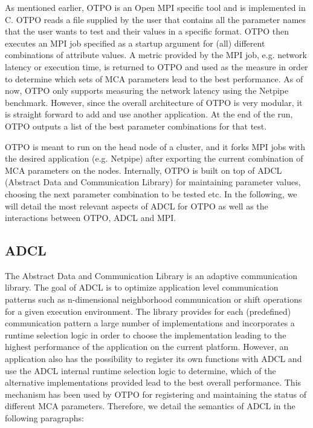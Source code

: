 As mentioned earlier, OTPO is an Open MPI specific tool and is implemented in C. OTPO reads a file supplied by the
user that contains all the parameter names that the user wants to test and their values in a specific format. OTPO then executes an MPI job specified as a startup argument for (all) different combinations of attribute values. A metric provided by the MPI job, e.g. network latency or execution time, is returned to OTPO and used as the measure in order to determine which sets of MCA parameters lead to the best performance. As of now, OTPO only supports measuring the network latency using the Netpipe\cite{netpipe} benchmark. However, since the overall architecture of OTPO is very modular, it is straight forward to add and use another application. At the end of the run, OTPO outputs a list of the best parameter combinations for that test.

OTPO is meant to run on the head node of a cluster, and it forks MPI jobs with the desired application (e.g. Netpipe) after exporting the current combination of MCA parameters on the nodes. Internally, OTPO is built on top of ADCL \cite{ADCL} (Abstract Data and Communication Library) for maintaining parameter values, choosing the next parameter combination to be tested etc. In the following, we will detail the most relevant aspects of ADCL for OTPO as well as the interactions between OTPO, ADCL and MPI.

\subsection{ADCL}
The Abstract Data and Communication Library is an adaptive communication library. The goal of ADCL is to optimize application level communication patterns such as n-dimensional neighborhood communication or shift operations for a given execution environment. The library provides for each (predefined) communication pattern a large number of implementations and incorporates a runtime selection logic in order to choose the implementation leading to the highest performance of the application on the current platform. However, an application also has the possibility to register its own functions with ADCL and use the ADCL internal runtime selection logic to determine, which of the alternative implementations provided lead to the best overall performance. This mechanism has been used by OTPO for registering and maintaining the status of different MCA parameters. Therefore, we detail the semantics of ADCL in the following paragraphs:

